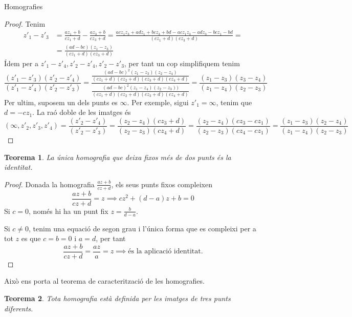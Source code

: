 \documentclass[dvipsnames, svgnames, leqno, a4paper, 12pt]{report}
\numberwithin{equation}{chapter}
\newtheorem{theorem}{Teorema}[chapter]
\theoremstyle{definition}
\theoremstyle{remark}
\begin{document}
\begin{chapter}{Homografies}
\begin{proof}
        Tenim \begin{align*}
            z'_1-z'_3 &=\frac{az_1+b}{cz_1+d}-\frac{az_3+b}{cz_3+d} = \frac{acz_1z_3+adz_1+bcz_3+bd-acz_1z_3-adz_3-bcz_1-bd}{(cz_1+d)(cz_3+d)} = \\
            &= \frac{(ad-bc)(z_1-z_3)}{(cz_1+d)(cz_3+d)}
        \end{align*}
        Ídem per a $z'_1-z'_4, z'_2-z'_4, z'_2-z'_3$, per tant un cop simplifiquem tenim 
        \begin{displaymath}
            \frac{(z'_1-z'_3)(z'_2-z'_4)}{(z'_1-z'_4)(z'_2-z'_3)}=\frac{\frac{(ad-bc)^2(z_1-z_3)(z_2-z_4)}{(cz_1+d)(cz_2+d)(cz_3+d)(cz_4+d)}}{\frac{(ad-bc)^2(z_1-z_4)(z_2-z_3))}{(cz_1+d)(cz_2+d)(cz_3+d)(cz_4+d)}} = \frac{(z_1-z_3)(z_3-z_4)}{(z_1-z_4)(z_2-z_3)}
        \end{displaymath}
        Per ultim, suposem un dels punts es $\infty$. Per exemple, sigui $z'_1=\infty$, tenim que $d=-cz_1$. La raó doble de les imatges és \begin{displaymath}
            (\infty,z'_2,z'_3,z'_4)=\frac{(z'_2-z'_4)}{(z'_2-z'_3)}=\frac{(z_2-z_4)(cz_3+d)}{(z_2-z_3)(cz_4+d)}=\frac{(z_2-z_4)(cz_3-cz_1)}{(z_2-z_3)(cz_4-cz_1)}=\frac{(z_1-z_3)(z_2-z_4)}{(z_1-z_4)(z_2-z_3)}
        \end{displaymath}
    \end{proof}
    \begin{theorem}
        La única homografia que deixa fixos més de dos punts és la identitat.
    \end{theorem}
    \begin{proof}
        Donada la homografia $\frac{az+b}{cz+d}$, els seus punts fixos compleixen \begin{displaymath}
            \frac{az+b}{cz+d}=z\implies cz^2+(d-a)z+b=0
        \end{displaymath}
        Si $c=0$, només hi ha un punt fix $z=\frac{b}{d-a}$.

        Si $c\neq0$, tenim una equació de segon grau i l'única forma que es compleixi per a tot $z$ es que $c=b=0$ i $a=d$, per tant \begin{displaymath}
            \frac{az+b}{cz+d}=\frac{az}{a}=z\implies \text{és la aplicació identitat.}
        \end{displaymath}
    \end{proof}
    Això ens porta al teorema de caracterització de les homografies.
    \begin{theorem}
        Tota homografia està definida per les imatges de tres punts diferents. 


\end{theorem}
\end{chapter}
\end{document}
